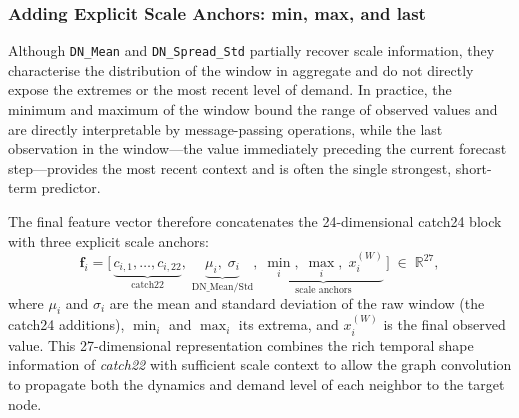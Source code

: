 \subsubsection{Adding Explicit Scale Anchors: min, max, and last}

Although \texttt{DN\_Mean} and \texttt{DN\_Spread\_Std} partially recover
scale information, they characterise the distribution of the window in
aggregate and do not directly expose the extremes or the most recent level of
demand.  In practice, the minimum and maximum of the window bound the range of
observed values and are directly interpretable by message-passing operations,
while the last observation in the window---the value immediately preceding the
current forecast step---provides the most recent context and is often the
single strongest, short-term predictor.

The final feature vector therefore concatenates the 24-dimensional catch24
block with three explicit scale anchors:
\[
\mathbf{f}_i = \bigl[\,\underbrace{c_{i,1},\ldots,c_{i,22}}_{\text{catch22}},\;
\underbrace{\mu_i,\;\sigma_i}_{\text{DN\_Mean/Std}},\;
\underbrace{\min_i,\;\max_i,\;x_i^{(W)}}_{\text{scale anchors}}\,\bigr]
\;\in\;\mathbb{R}^{27},
\]
where $\mu_i$ and $\sigma_i$ are the mean and standard deviation of the raw
window (the catch24 additions), $\min_i$ and $\max_i$ its extrema, and
$x_i^{(W)}$ is the final observed value.  This 27-dimensional representation
combines the rich temporal shape information of \textit{catch22} with
sufficient scale context to allow the graph convolution to propagate both the
dynamics and demand level of each neighbor to the target node.


